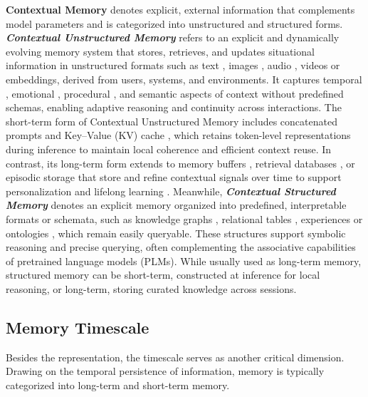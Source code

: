 \documentclass[manuscript,screen]{acmart}
\newcommand{\zhaowei}[1]{\textcolor{cyan}{[ZW: #1]}}
\begin{document}
\textbf{Contextual Memory} denotes explicit, external information that complements model parameters and is categorized into unstructured and structured forms. \textit{\textbf{Contextual Unstructured Memory}} refers to an explicit and dynamically evolving memory system that stores, retrieves, and updates situational information in unstructured formats such as text \citep{zhong2024memorybank}, images \citep{wang2025new}, audio \citep{long2025seeinglisteningrememberingreasoning} , videos \citep{ wang2023lifelongmemory, yu2025context} or embeddings, derived from users, systems, and environments. It captures temporal \citep{ge2025tremu}, emotional \citep{yang-etal-2024-iterative}, procedural \citep{fang2025memp}, and semantic aspects of context without predefined schemas, enabling adaptive reasoning and continuity across interactions. The short-term form of Contextual Unstructured Memory includes concatenated prompts and Key–Value (KV) cache \citep{yang2024memory3}, which retains token-level representations during inference to maintain local coherence and efficient context reuse. In contrast, its long-term form extends to memory buffers \citep{packer2023memgpt}, retrieval databases \citep{wang2024symbolic}, or episodic storage \citep{hu2025evaluating} that store and refine contextual signals over time to support personalization and lifelong learning \citep{li2024hello}. Meanwhile, \textit{\textbf{Contextual Structured Memory}} denotes an explicit memory organized into predefined, interpretable formats or schemata, such as knowledge graphs \citep{wang-etal-2024-absinstruct,oguz-etal-2022-unik}, relational tables \citep{lu2023memochat}, experiences \citep{ouyang2025reasoningbank} or ontologies \citep{qiang2023agent}, which remain easily queryable. These structures support symbolic reasoning and precise querying, often complementing the associative capabilities of pretrained language models (PLMs). While usually used as long-term memory, structured memory can be short-term, constructed at inference for local reasoning, or long-term, storing curated knowledge across sessions.

\subsection{Memory Timescale}
Besides the representation, the timescale serves as another critical dimension. Drawing on the temporal persistence of information, memory is typically categorized into long-term and short-term memory.
\end{document}
